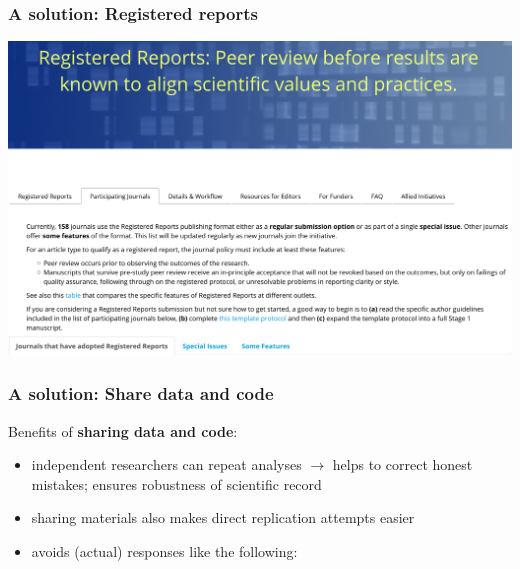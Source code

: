 \documentclass{beamer}
\begin{document}
\begin{frame}
\frametitle{A solution: Registered reports}

\begin{center}
\includegraphics[scale=0.25]{rr.png}
\end{center}


\end{frame}



\begin{frame}
\frametitle{A solution: Share data and code}


Benefits of \textbf{sharing data and code}:
 
 \begin{itemize}
 \item independent researchers can repeat analyses 
 $\rightarrow$ helps to correct honest mistakes; ensures robustness of scientific record
 \item sharing materials also makes direct replication attempts easier \pause
 \item avoids (actual) responses like the following:
 \end{itemize}
 
 
\end{frame}
\end{document}
